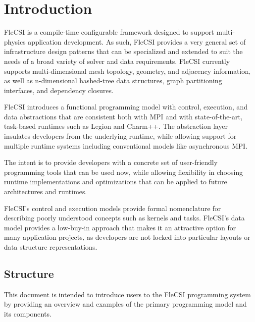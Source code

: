 \section*{Introduction}

FleCSI is a compile-time configurable framework designed to support
multi-physics application development.
As such, FleCSI provides a very general set of infrastructure design
patterns that can be specialized and extended to suit the needs of a
broad variety of solver and data requirements.
FleCSI currently supports multi-dimensional mesh topology, geometry, and
adjacency information, as well as n-dimensional hashed-tree data
structures, graph partitioning interfaces, and dependency closures.

FleCSI introduces a functional programming model with control,
execution, and data abstractions that are consistent both with MPI and
with state-of-the-art, task-based runtimes such as Legion and Charm++.
The abstraction layer insulates developers from the underlying runtime,
while allowing support for multiple runtime systems including
conventional models like asynchronous MPI.

The intent is to provide developers with a concrete set of user-friendly
programming tools that can be used now, while allowing flexibility in
choosing runtime implementations and optimizations that can be applied
to future architectures and runtimes.

FleCSI's control and execution models provide formal nomenclature for
describing poorly understood concepts such as kernels and tasks.
FleCSI's data model provides a low-buy-in approach that makes it an
attractive option for many application projects, as developers are not
locked into particular layouts or data structure representations.

\subsection*{Structure}

This document is intended to introduce users to the FleCSI programming
system by providing an overview and examples of the primary programming
model and its components.

